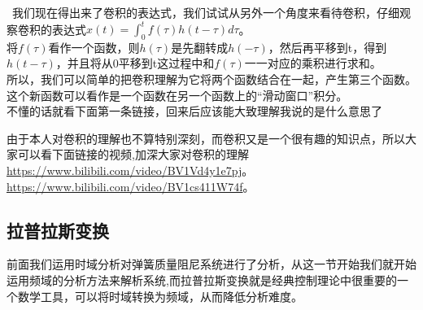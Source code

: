 \documentclass[UTF8,a4paper,12pt]{ctexart}
\begin{document}
    \begin{flushleft}
      \begin{notitlebox}
      \  我们现在得出来了卷积的表达式，我们试试从另外一个角度来看待卷积，仔细观察卷积的表达式$x(t) =\int_0^t{f\left( \tau \right)}h\left( t-\tau \right) d\tau $。
       \\将$f(\tau)$看作一个函数，则$h(\tau)$是先翻转成$h(-\tau)$，然后再平移到t，得到$h(t-\tau)$，并且将从0平移到t这过程中和$f(\tau)$一一对应的乘积进行求和。\\
         所以，我们可以简单的把卷积理解为它将两个函数结合在一起，产生第三个函数。这个新函数可以看作是一个函数在另一个函数上的“滑动窗口”积分。\\
       不懂的话就看下面第一条链接，回来后应该能大致理解我说的是什么意思了
    \end{notitlebox}
   \end{flushleft}
    由于本人对卷积的理解也不算特别深刻，而卷积又是一个很有趣的知识点，所以大家可以看下面链接的视频,加深大家对卷积的理解\\
    \href{https://www.bilibili.com/video/BV1Vd4y1e7pj/?spm_id_from=333.337.search-card.all.click&vd_source=b02f21f21dd17ebeef8dac9338c9d06c}{https://www.bilibili.com/video/BV1Vd4y1e7pj}。\\
    \href{https://www.bilibili.com/video/BV1cs411W74f/?spm_id_from=333.337.search-card.all.click&vd_source=b02f21f21dd17ebeef8dac9338c9d06c}{https://www.bilibili.com/video/BV1cs411W74f}。
  \subsection{拉普拉斯变换}
 \begin{flushleft}
  前面我们运用时域分析对弹簧质量阻尼系统进行了分析，从这一节开始我们就开始运用频域的分析方法来解析系统,而拉普拉斯变换就是经典控制理论中很重要的一个数学工具，可以将时域转换为频域，从而降低分析难度。
 \end{flushleft}
\end{document}
